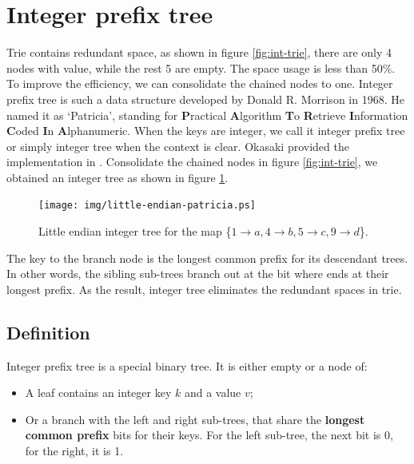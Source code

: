 \documentclass[b5paper]{article}
\begin{document}
\section{Integer prefix tree}
\label{int-patricia}
 

Trie contains redundant space, as shown in figure \ref{fig:int-trie}, there are only 4 nodes with value, while the rest 5 are empty. The space usage is less than 50\%. To improve the efficiency, we can consolidate the chained nodes to one. Integer prefix tree is such a data structure developed by Donald R. Morrison in 1968. He named it as `Patricia', standing for \textbf{P}ractical \textbf{A}lgorithm \textbf{T}o \textbf{R}etrieve \textbf{I}nformation \textbf{C}oded \textbf{I}n \textbf{A}lphanumeric\cite{patricia-morrison}. When the keys are integer, we call it integer prefix tree or simply integer tree when the context is clear. Okasaki provided the implementation in \cite{okasaki-int-map}. Consolidate the chained nodes in figure \ref{fig:int-trie}, we obtained an integer tree as shown in figure \ref{fig:little-endian-patricia}.

\begin{figure}[htbp]
  \centering
  \texttt{[image: img/little-endian-patricia.ps]}
  \caption{Little endian integer tree for the map
     \{$ 1 \rightarrow a, 4 \rightarrow b, 5 \rightarrow c, 9 \rightarrow d$\}.}
  \label{fig:little-endian-patricia}
\end{figure}

The key to the branch node is the longest common prefix for its descendant trees. In other words, the sibling sub-trees branch out at the bit where ends at their longest prefix. As the result, integer tree eliminates the redundant spaces in trie.

\subsection{Definition}

Integer prefix tree is a special binary tree. It is either empty or a node of:

\begin{itemize}
\item A leaf contains an integer key $k$ and a value $v$;
\item Or a branch with the left and right sub-trees, that share the \textbf{longest common prefix} bits for their keys. For the left sub-tree, the next bit is 0, for the right, it is 1.
\end{itemize}
\end{document}
